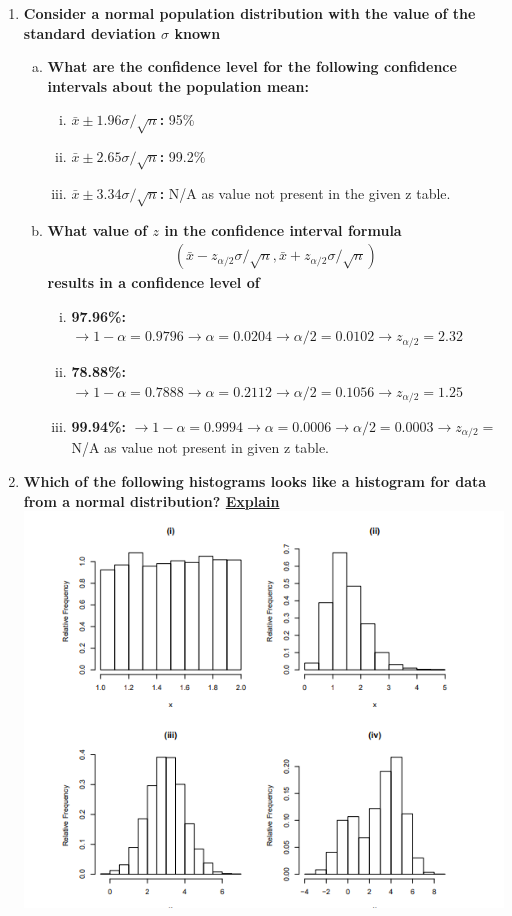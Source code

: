 \documentclass{article}
\begin{document}
\begin{enumerate}[1.]
\item
\textbf{Consider a normal population distribution with the value of the standard deviation $\sigma$ known}
\begin{enumerate}[(a)]
\item
\textbf{What are the confidence level for the following confidence intervals about the population mean:}
\begin{enumerate}[(i)]
  \item \textbf{$\bar{x} \pm 1.96\sigma/\sqrt{n}$: } 95\%
  \item \textbf{$\bar{x} \pm 2.65\sigma/\sqrt{n}$: } 99.2\%
  \item \textbf{$\bar{x} \pm 3.34\sigma/\sqrt{n}$: } N/A as value not present in the given z table.
\end{enumerate}

\item
\textbf{What value of $z$ in the confidence interval formula }
\begin{gather*}
(\bar{x} - z_{\alpha/2}\sigma/\sqrt{n}, \bar{x} + z_{\alpha/2}\sigma/\sqrt{n} )
\end{gather*}
\textbf{results in a confidence level of}

\begin{enumerate}[(i)]
  \item \textbf{97.96\%: } $\to 1 - \alpha = 0.9796 \to \alpha = 0.0204 \to \alpha / 2 = 0.0102 \to z_{\alpha/2} =  2.32$
  \item \textbf{78.88\%: } $\to 1 - \alpha = 0.7888 \to \alpha = 0.2112 \to \alpha / 2 = 0.1056 \to z_{\alpha/2} = 1.25$
  \item \textbf{99.94\%: } $\to 1 - \alpha = 0.9994 \to \alpha = 0.0006 \to \alpha / 2 = 0.0003 \to z_{\alpha/2} = $ N/A as value not present in given z table.
\end{enumerate}
\end{enumerate}

\item
\textbf{Which of the following histograms looks like a histogram for data from a normal distribution? \underline{Explain}}
\includegraphics{graphs}


\end{enumerate}
\end{document}
